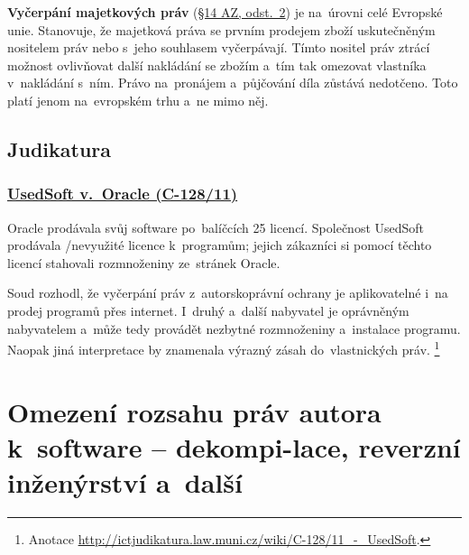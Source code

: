\textbf{Vyčerpání majetkových práv} (\href{https://www.zakonyprolidi.cz/cs/2000-121#p14-2}{§14 AZ, odst.~2}) je na~úrovni celé Evropské unie. Stanovuje, že majetková práva se prvním prodejem zboží uskutečněným nositelem práv nebo s~jeho souhlasem vyčerpávají. Tímto nositel práv ztrácí možnost ovlivňovat další nakládání se zbožím a~tím tak omezovat vlastníka v~nakládání s~ním. Právo na~pronájem a~půjčování díla zůstává nedotčeno. Toto platí jenom na~evropském trhu a~ne mimo něj.

\subsection{Judikatura}

\subsubsection{\href{https://curia.europa.eu/juris/liste.jsf?num=C-128\%2F11}{UsedSoft v.~Oracle (C-128/11)}}

Oracle prodávala svůj software po~balíčcích 25 licencí. Společnost UsedSoft prodávala /nevyužité licence k~programům; jejich zákazníci si pomocí těchto licencí stahovali rozmnoženiny ze~stránek Oracle.

Soud rozhodl, že vyčerpání práv z~autorskoprávní ochrany je aplikovatelné i~na prodej programů přes internet. I~druhý a~další nabyvatel je oprávněným nabyvatelem a~může tedy provádět nezbytné rozmnoženiny a~instalace programu. Naopak jiná interpretace by znamenala výrazný zásah do~vlastnických práv.%
\footnote{Anotace \url{http://ictjudikatura.law.muni.cz/wiki/C-128/11_-_UsedSoft}.}

%
%

\clearpage
\section[Omezení rozsahu práv autora k~software -- dekompilace, reverzní inženýrství a~další]{Omezení rozsahu práv autora k~software -- dekompi-lace, reverzní inženýrství a~další}

